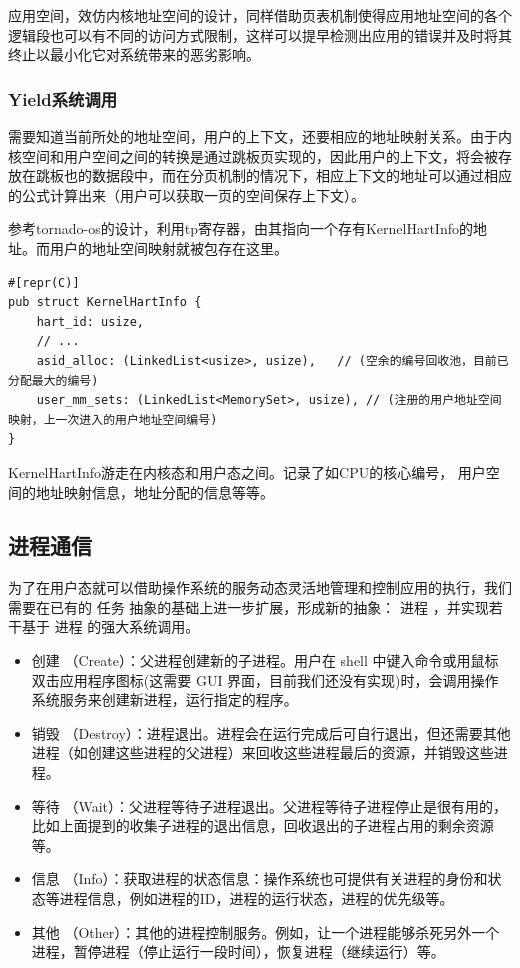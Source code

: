 应用空间，效仿内核地址空间的设计，同样借助页表机制使得应用地址空间的各个逻辑段也可以有不同的访问方式限制，这样可以提早检测出应用的错误并及时将其终止以最小化它对系统带来的恶劣影响。

\subsubsection{Yield系统调用}

需要知道当前所处的地址空间，用户的上下文，还要相应的地址映射关系。由于内核空间和用户空间之间的转换是通过跳板页实现的，因此用户的上下文，将会被存放在跳板也的数据段中，而在分页机制的情况下，相应上下文的地址可以通过相应的公式计算出来（用户可以获取一页的空间保存上下文）。

参考tornado-os的设计，利用tp寄存器，由其指向一个存有KernelHartInfo的地址。而用户的地址空间映射就被包存在这里。

\begin{lstlisting}[caption=KernelHartInfo的结构]
#[repr(C)]
pub struct KernelHartInfo {
    hart_id: usize,
    // ...
    asid_alloc: (LinkedList<usize>, usize),   // (空余的编号回收池，目前已分配最大的编号)
    user_mm_sets: (LinkedList<MemorySet>, usize), // (注册的用户地址空间映射，上一次进入的用户地址空间编号)
}
\end{lstlisting}

KernelHartInfo游走在内核态和用户态之间。记录了如CPU的核心编号， 用户空间的地址映射信息，地址分配的信息等等。

\subsection{进程通信}

为了在用户态就可以借助操作系统的服务动态灵活地管理和控制应用的执行，我们需要在已有的 任务 抽象的基础上进一步扩展，形成新的抽象： 进程 ，并实现若干基于 进程 的强大系统调用。

\begin{itemize}
\item 创建 （Create）：父进程创建新的子进程。用户在 shell 中键入命令或用鼠标双击应用程序图标(这需要 GUI 界面，目前我们还没有实现)时，会调用操作系统服务来创建新进程，运行指定的程序。
\item 销毁 （Destroy）：进程退出。进程会在运行完成后可自行退出，但还需要其他进程（如创建这些进程的父进程）来回收这些进程最后的资源，并销毁这些进程。
\item 等待 （Wait）：父进程等待子进程退出。父进程等待子进程停止是很有用的，比如上面提到的收集子进程的退出信息，回收退出的子进程占用的剩余资源等。
\item 信息 （Info）：获取进程的状态信息：操作系统也可提供有关进程的身份和状态等进程信息，例如进程的ID，进程的运行状态，进程的优先级等。
\item 其他 （Other）：其他的进程控制服务。例如，让一个进程能够杀死另外一个进程，暂停进程（停止运行一段时间），恢复进程（继续运行）等。
\end{itemize}


